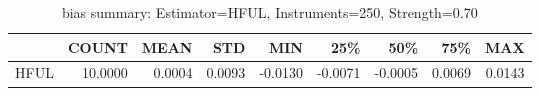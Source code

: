 \begin{table}[ht]
\centering
\caption{bias summary: Estimator=HFUL, Instruments=250, Strength=0.70}
\begin{tabular}{lrrrrrrrr}
\toprule
 & COUNT & MEAN & STD & MIN & 25\% & 50\% & 75\% & MAX \\
\midrule
HFUL & 10.0000 & 0.0004 & 0.0093 & -0.0130 & -0.0071 & -0.0005 & 0.0069 & 0.0143 \\
\bottomrule
\end{tabular}
\end{table}
